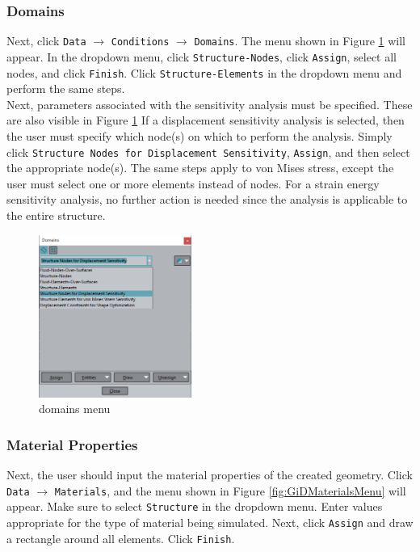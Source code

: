 \subsubsection{Domains}
Next, click \texttt{Data} $\rightarrow$ \texttt{Conditions} $\rightarrow$ \texttt{Domains}. The menu shown in Figure \ref{fig:GiDDomainsMenu} will appear. In the dropdown menu, click \texttt{Structure-Nodes}, click \texttt{Assign}, select all nodes, and click \texttt{Finish}. Click \texttt{Structure-Elements} in the dropdown menu and perform the same steps.\\[3pt]
Next, parameters associated with the sensitivity analysis must be specified. These are also visible in Figure \ref{fig:GiDDomainsMenu} If a displacement sensitivity analysis is selected, then the user must specify which node(s) on which to perform the analysis. Simply click \texttt{Structure Nodes for Displacement Sensitivity}, \texttt{Assign}, and then select the appropriate node(s). The same steps apply to von Mises stress, except the user must select one or more elements instead of nodes. For a strain energy sensitivity analysis, no further action is needed since the analysis is applicable to the entire structure.
\begin{figure}[ht]
  \centering
  \includegraphics[width=50mm]{images/GiD_domains.png}
  \caption{domains menu}
  \label{fig:GiDDomainsMenu}
\end{figure}
\subsubsection{Material Properties}
Next, the user should input the material properties of the created geometry. Click \texttt{Data} $\rightarrow$ \texttt{Materials}, and the menu shown in Figure \ref{fig:GiDMaterialsMenu} will appear. Make sure to select \texttt{Structure} in the dropdown menu. Enter values appropriate for the type of material being simulated. Next, click \texttt{Assign} and draw a rectangle around all elements. Click \texttt{Finish}.

